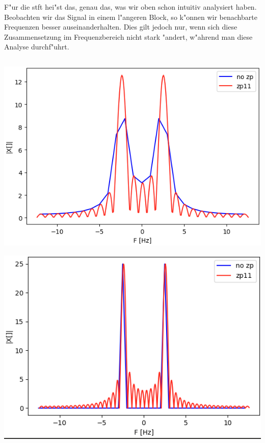 F"ur die \gls{stft} hei"st das, genau das, was wir oben schon intuitiv analysiert haben. 
Beobachten wir das Signal in einem l"angeren Block, so k"onnen wir benachbarte Frequenzen besser auseinanderhalten.
Dies gilt jedoch nur, wenn sich diese Zusammensetzung im Frequenzbereich nicht stark "andert, w"ahrend man diese Analyse durchf"uhrt.
%
\begin{listing}[ht]
    \noindent
    \begin{minipage}{0.51\textwidth}
        \strut\vspace*{-\baselineskip}\newline
        \inputminted[firstline=4, lastline=19]{python3}{code/stft_harm.py}
    \end{minipage}%
    \begin{minipage}{0.48\textwidth}
        \strut\vspace*{-\baselineskip}\newline
        \includegraphics[width=\textwidth]{code/stft_harm.png}

        \includegraphics[width=\textwidth]{code/stft_harm_2.png}
    \end{minipage}
    \label{py:stft_harm}
\end{listing}
